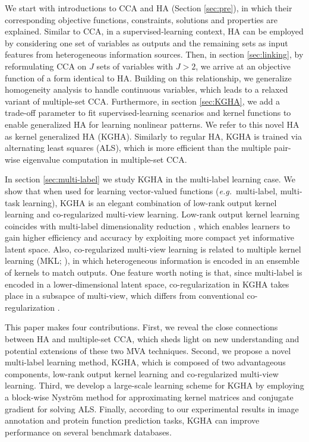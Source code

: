 \documentclass[a4paper]{article}
\begin{document}
We start with introductions to CCA and HA (Section \ref{sec:pre}), in which their corresponding objective 
functions, constraints, solutions and properties are explained. Similar to CCA, in a supervised-learning context, HA can be employed by considering one set of variables as 
outputs and the remaining sets as input 
features from heterogeneous information sources. 
Then, in section \ref{sec:linking}, by reformulating CCA on $J$ sets of variables with $J>2$, we 
arrive at an objective function of a form identical to HA.  Building on this relationship, we generalize homogeneity analysis to handle continuous 
variables, which leads to a relaxed variant of multiple-set CCA. Furthermore, in section \ref{sec:KGHA}, we add a trade-off parameter to fit supervised-learning scenarios and kernel functions to 
enable generalized HA for learning nonlinear patterns.  
We refer to this novel HA as kernel generalized HA (KGHA). Similarly to regular HA, KGHA is trained via alternating least squares (ALS), which is more efficient than the multiple pair-wise eigenvalue  
computation in multiple-set CCA. 

In section \ref{sec:multi-label} we study KGHA in the multi-label learning case.  We show that when used 
for learning vector-valued functions (\emph{e.g.}\ multi-label, multi-task learning), KGHA is an elegant combination of low-rank output kernel learning and co-regularized multi-view learning. 
Low-rank output kernel learning coincides with multi-label dimensionality reduction \citep{sun_MLDR}, which enables learners to gain higher efficiency and 
accuracy \citep{Ji_2009_IJCAI} by exploiting more compact yet informative latent space. Also, co-regularized multi-view learning  is related to multiple kernel learning 
(MKL; \citeauthor{MKL_cv} \citeyear{MKL_cv}), in which heterogeneous information is encoded in an ensemble of kernels to match outputs. One feature worth noting is that, 
since multi-label is encoded in a lower-dimensional latent space, co-regularization in KGHA takes place in a subsapce of multi-view, which differs from conventional 
co-regularization \citep{Rosenberg_2007_AISTATS}.                   

This paper makes four contributions. First, we reveal the close connections between HA and multiple-set CCA, which sheds light on new understanding   
and potential extensions of these two MVA techniques. 
Second, we propose a novel multi-label learning method, KGHA, which is composed of two advantageous components, low-rank output kernel 
learning and co-regularized multi-view learning. 
Third, we develop a large-scale learning scheme for KGHA by employing a block-wise Nystr{\"o}m method for approximating kernel matrices and conjugate gradient for solving ALS.           
Finally, according to our experimental results in image annotation and protein function prediction tasks, KGHA can improve performance on several benchmark databases.    
          
\end{document}
